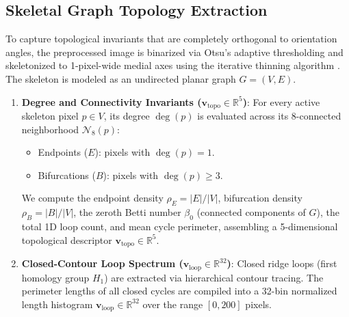 \documentclass[lettersize,journal]{IEEEtran}
\begin{document}
\subsection{Skeletal Graph Topology Extraction}
To capture topological invariants that are completely orthogonal to orientation angles, the preprocessed image is binarized via Otsu's adaptive thresholding and skeletonized to 1-pixel-wide medial axes using the iterative thinning algorithm \cite{b32}. The skeleton is modeled as an undirected planar graph $G = (V, E)$.
\begin{enumerate}
    \item \textbf{Degree and Connectivity Invariants ($\mathbf{v}_{\text{topo}} \in \mathbb{R}^5$)}: For every active skeleton pixel $p \in V$, its degree $\operatorname{deg}(p)$ is evaluated across its 8-connected neighborhood $\mathcal{N}_8(p)$:
    \begin{itemize}
        \item Endpoints ($E$): pixels with $\operatorname{deg}(p) = 1$.
        \item Bifurcations ($B$): pixels with $\operatorname{deg}(p) \ge 3$.
    \end{itemize}
    We compute the endpoint density $\rho_E = |E| / |V|$, bifurcation density $\rho_B = |B| / |V|$, the zeroth Betti number $\beta_0$ (connected components of $G$), the total 1D loop count, and mean cycle perimeter, assembling a 5-dimensional topological descriptor $\mathbf{v}_{\text{topo}} \in \mathbb{R}^5$.
    \item \textbf{Closed-Contour Loop Spectrum ($\mathbf{v}_{\text{loop}} \in \mathbb{R}^{32}$)}: Closed ridge loops (first homology group $H_1$) are extracted via hierarchical contour tracing. The perimeter lengths of all closed cycles are compiled into a 32-bin normalized length histogram $\mathbf{v}_{\text{loop}} \in \mathbb{R}^{32}$ over the range $[0, 200]$ pixels.
\end{enumerate}
\end{document}
